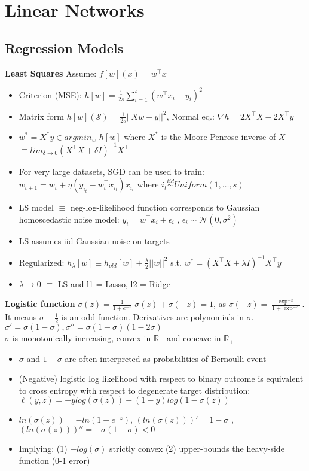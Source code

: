 \section{Linear Networks}
\subsection{Regression Models}
\textbf{Least Squares} Assume: \(f[w](x) = w^\top x \)
\begin{itemize}
    \item Criterion (MSE): \(h[w] = \frac{1}{2s}\sum_{i=1}^s(w^\top x_i-y_i)^2\)
    \item Matrix form \(h[w](\mathcal{S})=\frac{1}{2s}||Xw-y||^2\), Normal eq.: \(\nabla h = 2X^\top X-2X^\top y\)
    \item \(w^* = X^*y \in argmin_w\) \(h[w]\) where \(X^*\) is the Moore-Penrose inverse of \(X\)  \(\equiv lim_{\delta\rightarrow0}(X^\top X + \delta I)^{-1}X^\top\)
    \item For very large datasets, SGD can be used to train: \\ \(w_{t+1} = w_t + \eta (y_{i_t}-w_t^\top x_{i_t})x_{i_t}\) where \(i_t \overset{iid}{\sim} Uniform(1,\dots, s)\)
    \item LS model \(\equiv\) neg-log-likelihood function corresponds to Gaussian homoscedastic noise model: \(y_i =w^\top x_i + \epsilon_i\) , \(\epsilon_i \sim \mathcal{N}(0,\sigma^2)\)
    \item LS assumes iid Gaussian noise on targets
    \item Regularized: \(h_\lambda[w] \equiv h_{old}[w] + \frac{\lambda}{2}||w||^2\) s.t. \(w^* = (X^\top X + \lambda I)^{-1}X^\top y\)
    \item \(\lambda \rightarrow 0\) \(\equiv\) LS and l1 = Lasso, l2 = Ridge
\end{itemize} 
\textbf{Logistic function} \(\sigma(z) = \frac{1}{1+e^{-z}}\)
$\sigma(z) + \sigma(-z) = 1$, as $\sigma(-z)=\frac{\exp^{-z}}{1+\exp^{-z}}$. It means $\sigma - \frac{1}{2}$ is an odd function. Derivatives are polynomials in $\sigma$. \(\sigma' = \sigma(1-\sigma), \sigma'' =  \sigma(1-\sigma)(1-2\sigma)\)\\
\(\sigma\) is monotonically increasing, convex in \(\mathbb{R}_-\) and concave in \(\mathbb{R}_+\) \begin{itemize}
    \item \(\sigma\) and \(1-\sigma\) are often interpreted as probabilities of Bernoulli event
    \item  (Negative) logistic log likelihood with respect to binary outcome is equivalent to cross entropy with respect to degenerate target distribution: \(\ell(y,z) =-y log (\sigma(z)) - (1-y)log(1-\sigma(z))\)
    \item $ln(\sigma(z)) = -ln(1+e^{-z})$, \((ln(\sigma(z)))' = 1- \sigma\) , \((ln(\sigma(z)))'' = -\sigma(1- \sigma)<0\) 
    \item Implying: (1) \(-log(\sigma)\) strictly convex (2) upper-bounds the heavy-side function (0-1 error) 
\end{itemize}
